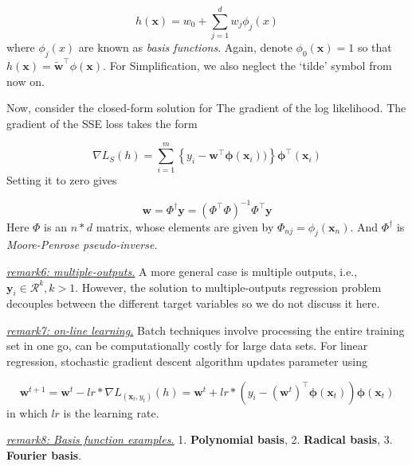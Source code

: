 \documentclass{article}
\begin{document}
	\begin{equation}
	h(\mathbf{x}) = w_0 + \sum_{j=1}^d w_j \phi_j(x)
	\end{equation}
where $\phi_j(x)$ are known as \textit{basis functions}. Again, denote $\phi_0(\mathbf{x})=1$ so that $h(\mathbf{x}) = \tilde{\mathbf{w}}^\top \phi(\mathbf{x})$. For Simplification, we also neglect the `tilde' symbol from now on.

	Now, consider the closed-form solution for The gradient of the log likelihood. The gradient of the SSE loss takes the form
	
	\begin{equation*}
	\nabla L_S(h) = \sum_{i=1}^m \left\{ y_i - \mathbf{w}^\top \mathbf{\phi} (\mathbf{x}_i)) \right\} \mathbf{\phi}^\top (\mathbf{x}_i)
	\end{equation*}
Setting it to zero gives 

	\begin{equation}
	\label{eqn:mp_solved}
	\mathbf{w} = \Phi^\dag \mathbf{y} = (\Phi^\top \Phi)^{-1} \Phi^\top \mathbf{y}
	\end{equation}
Here $\Phi$ is an $n*d$ matrix, whose elements are given by $\Phi_{nj} = \phi_j(\mathbf{x}_n)$. And $\Phi^\dag$ is \textit{Moore-Penrose pseudo-inverse}.

	\vspace{2mm}
	\begin{scriptsize}
	\begin{spacing}{1.2}
	{\sffamily 
	\textit{\underline{remark6: multiple-outputs.}} A more general case is multiple outputs, i.e., $\mathbf{y}_i \in \mathcal{R}^k, k>1$. However, the solution to multiple-outputs regression problem decouples between the different target variables so we do not discuss it here.
	
	\textit{\underline{remark7: on-line learning.}} Batch techniques involve processing the entire training set in one go, can be computationally costly for large data sets. For linear regression, stochastic gradient descent algorithm updates parameter using
	
	\begin{equation*}
	\mathbf{w}^{t+1}=\mathbf{w}^{t} - lr*\nabla L_{(\mathbf{x}_t,y_t)}(h) = \mathbf{w}^{t} + lr* (y_i - (\mathbf{w}^t)^\top \mathbf{\phi} (\mathbf{x}_t)) \mathbf{\phi} (\mathbf{x}_t)
	\end{equation*}
in which $lr$ is the learning rate.

	\textit{\underline{remark8: Basis function examples.}} 1. \textbf{Polynomial basis}, 2. \textbf{Radical basis}, 3. \textbf{Fourier basis}.
	}
	\end{spacing}
	\end{scriptsize}
	\vspace{-2mm}
	
\end{document}
